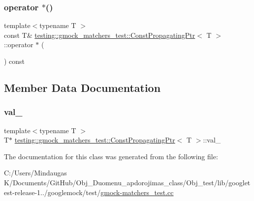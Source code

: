 \subsubsection{\texorpdfstring{operator $\ast$()}{operator *()}\hspace{0.1cm}{\footnotesize\ttfamily [2/2]}}
{\footnotesize\ttfamily template$<$typename T $>$ \\
const T\& \mbox{\hyperlink{classtesting_1_1gmock__matchers__test_1_1_const_propagating_ptr}{testing\+::gmock\+\_\+matchers\+\_\+test\+::\+Const\+Propagating\+Ptr}}$<$ T $>$\+::operator $\ast$ (\begin{DoxyParamCaption}{ }\end{DoxyParamCaption}) const\hspace{0.3cm}{\ttfamily [inline]}}



\subsection{Member Data Documentation}
\mbox{\label{classtesting_1_1gmock__matchers__test_1_1_const_propagating_ptr_af31f8921e4833fa88d2c233c5ac95e2e}} 
\subsubsection{\texorpdfstring{val\_}{val\_}}
{\footnotesize\ttfamily template$<$typename T $>$ \\
T$\ast$ \mbox{\hyperlink{classtesting_1_1gmock__matchers__test_1_1_const_propagating_ptr}{testing\+::gmock\+\_\+matchers\+\_\+test\+::\+Const\+Propagating\+Ptr}}$<$ T $>$\+::val\+\_\+\hspace{0.3cm}{\ttfamily [private]}}



The documentation for this class was generated from the following file\+:\begin{DoxyCompactItemize}
\item 
C\+:/\+Users/\+Mindaugas K/\+Documents/\+Git\+Hub/\+Obj\+\_\+\+Duomenu\+\_\+apdorojimas\+\_\+class/\+Obj\+\_\+test/lib/googletest-\/release-\/1../googlemock/test/\mbox{\hyperlink{_obj__test_2lib_2googletest-release-1_88_81_2googlemock_2test_2gmock-matchers__test_8cc}{gmock-\/matchers\+\_\+test.\+cc}}\end{DoxyCompactItemize}
